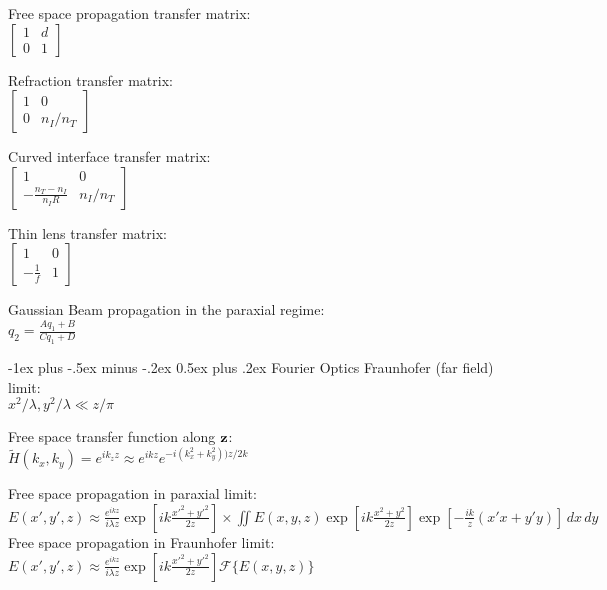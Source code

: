 \documentclass[12pt,landscape]{article}
\makeatletter
\renewcommand{\section}{\@startsection{section}{1}{0mm}%
                                {-1ex plus -.5ex minus -.2ex}%
                                {0.5ex plus .2ex}%
                                {\normalfont\normalsize\bfseries}}
\newcommand{\tab}{\hspace{.02\textwidth}}
\newcommand{\ds}{\displaystyle}
\makeatother
\begin{document}
\begin{multicols}{3}
Free space propagation transfer matrix:\\
\tab $\begin{bmatrix}1 & d\\ 0 & 1\end{bmatrix}$

Refraction transfer matrix:\\
\tab $\begin{bmatrix}1 & 0\\ 0 & n_I/n_T\end{bmatrix}$

Curved interface transfer matrix:\\
\tab $\begin{bmatrix}1 & 0\\ -\frac{n_T-n_I}{n_I R} & n_I/n_T\end{bmatrix}$

Thin lens transfer matrix:\\
\tab $\begin{bmatrix}1 & 0\\ -\frac{1}{f} & 1\end{bmatrix}$

Gaussian Beam propagation in the paraxial regime:\\
\tab $\ds q_2 = \frac{Aq_1 + B}{Cq_1 + D}$

\section{Fourier Optics}
Fraunhofer (far field) limit:\\
\tab $x^2/\lambda, y^2/\lambda \ll z/\pi$

Free space transfer function along $\vb{z}$:\\
\tab $\tilde{H}(k_x, k_y) = e^{ik_z z} \approx e^{ikz}e^{-i(k_x^2 + k_y^2))z/2k}$

Free space propagation in paraxial limit:\\
\tab $\ds E(x',y',z) \approx \frac{e^{ikz}}{i\lambda z}\exp\left[ik\frac{x'^2 + y'^2 }{2z}\right]\times\iint E(x,y,z)\exp\left[ik\frac{x^2 + y^2 }{2z}\right]\exp\left[-\frac{ik}{z}(x'x + y'y)\right]\,dx\,dy$\\

\columnbreak
Free space propagation in Fraunhofer limit:\\
\tab $\ds E(x', y', z) \approx \frac{e^{ikz}}{i\lambda z} \exp\left[ik\frac{x'^2 + y'^2}{2z}\right]\mathcal{F}\{E(x,y, z)\}$


\end{multicols}
\end{document}
